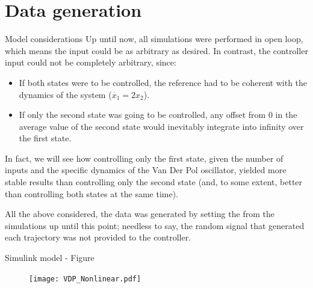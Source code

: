 \documentclass{beamer}
\begin{document}
\section{Data generation}

\begin{frame}{Model considerations}
    Up until now, all simulations were performed in open loop, which means the input could be as arbitrary as desired. In contrast, the controller input could not be completely arbitrary, since:

    \begin{itemize}
        \item If both states were to be controlled, the reference had to be coherent with the dynamics of the system ($\dot{x_1} = 2 x_2$).
        \item If only the second state was going to be controlled, any offset from 0 in the average value of the second state would inevitably integrate into infinity over the first state.
    \end{itemize}

    In fact, we will see how controlling only the first state, given the number of inputs and the specific dynamics of the Van Der Pol oscillator, yielded more stable results than controlling only the second state (and, to some extent, better than controlling both states at the same time).

    All the above considered, the data was generated by setting the  from the simulations up until this point; needless to say, the random signal that generated each trajectory was not provided to the controller.
\end{frame}

\begin{frame}{Simulink model - Figure}
    \begin{figure}[ht!]
        \centering
        \texttt{[image: VDP\_Nonlinear.pdf]}
    \end{figure}
\end{frame}
\end{document}
